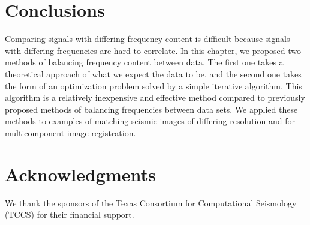 
\section{Conclusions}
        Comparing signals with differing frequency content is difficult because signals with differing frequencies are hard to correlate. 
        In this chapter, we proposed two methods of balancing frequency content between data. 
        The first one takes a theoretical approach of what we expect the data to be, and the second one takes the form of an optimization problem solved by a simple iterative algorithm. 
        This algorithm is a relatively inexpensive and effective method compared to previously proposed methods of balancing frequencies between data sets. 
        We applied these methods to examples of matching seismic images of differing resolution and for multicomponent image registration.


\section{Acknowledgments}
        We thank the sponsors of the Texas Consortium for Computational Seismology (TCCS) for their financial support.
